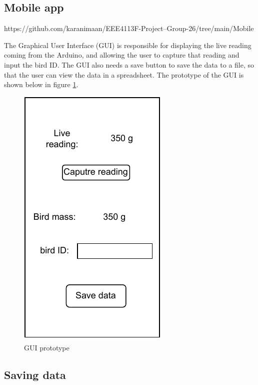 \documentclass[class=report,11pt,crop=false]{standalone}
\begin{document}
		
		\subsection{Mobile app}
		
		
		https://github.com/karanimaan/EEE4113F-Project--Group-26/tree/main/Mobile%
		
		The Graphical User Interface (GUI) is responsible for displaying the live reading coming from the Arduino, and allowing the user to capture that reading and input the bird ID. The GUI also needs a save button to save the data to a file, so that the user can view the data in a spreadsheet.
		The prototype of the GUI is shown below in figure \ref{fig:gui-prototype}.
		
		\begin{figure}[h!]
			\centering
			\includegraphics[scale=1]{"Figures/GUI prototype"}
			\caption{GUI prototype}
			\label{fig:gui-prototype}
		\end{figure}
	
		
		\subsection{Saving data}
		
\end{document}
